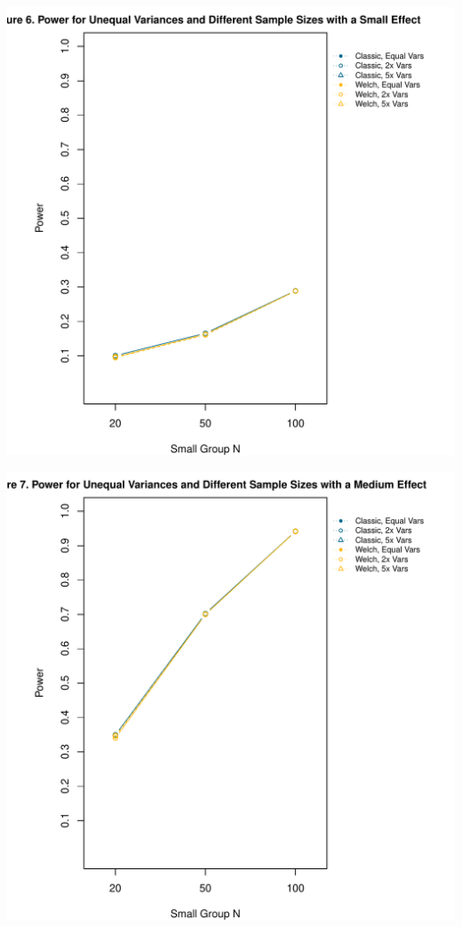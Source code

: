 \documentclass[man]{apa6}\usepackage[]{graphicx}\usepackage[]{color}
\makeatletter
\def\maxwidth{ %
  \ifdim\Gin@nat@width>\linewidth
    \linewidth
  \else
    \Gin@nat@width
  \fi
}
\newenvironment{knitrout}{}{} %
\makeatother
\begin{document}
\begin{knitrout}
\color{fgcolor}
\includegraphics[width=\maxwidth]{figure/unequal_vars_equal_Ns_different_ds1} 

\includegraphics[width=\maxwidth]{figure/unequal_vars_equal_Ns_different_ds2} 


\end{knitrout}
\end{document}
